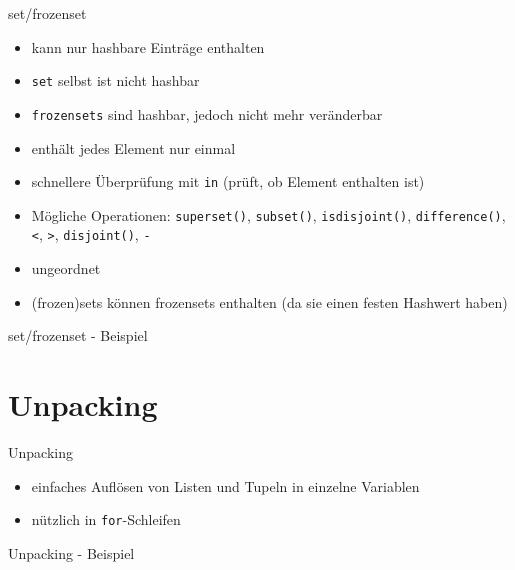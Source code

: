 \begin{frame}{set/frozenset}
	\begin{itemize}
		\item kann nur hashbare Einträge enthalten
		\item \texttt{set} selbst ist nicht hashbar
		\item \texttt{frozensets} sind hashbar, jedoch nicht mehr veränderbar
		\item enthält jedes Element nur einmal
		\item schnellere Überprüfung mit \alert{\texttt{in}} (prüft, ob Element enthalten ist)
		\item Mögliche Operationen: \alert{\texttt{superset()}}, \alert{\texttt{subset()}}, \alert{\texttt{isdisjoint()}}, \alert{\texttt{difference()}}, \alert{\texttt{<}}, \alert{\texttt{>}}, \alert{\texttt{disjoint()}}, \alert{\texttt{-}}
		\item ungeordnet
		\item (frozen)sets können frozensets enthalten (da sie einen festen Hashwert haben)
	\end{itemize}
\end{frame}

\begin{frame}{set/frozenset - Beispiel}
	
\end{frame}


\section{Unpacking}

\begin{frame}{Unpacking}
	\begin{itemize}
		\item einfaches Auflösen von Listen und Tupeln in einzelne Variablen
		\item nützlich in \alert{\texttt{for}}-Schleifen
	\end{itemize}
\end{frame}

\begin{frame}{Unpacking - Beispiel}
	
\end{frame}


